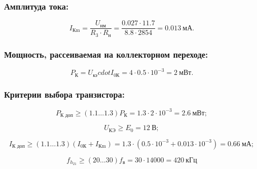   \subsubsection{Амплитуда тока:} %
  
  \begin{equation}
  \label{eq:equation6_9}
    I_{\text{Кm}} = \dfrac{U_{\text{нм}}}{R_3 \cdot R_{\text{н}}} = \dfrac{0.027 \cdot 11.7}{8.8 \cdot 2854} = 0.013~\text{мА}.
  \end{equation}
  
  \subsubsection{Мощность, рассеиваемая на коллекторном переходе:} %

  \begin{equation}
  \label{eq:equation6_10}
    P_{\text{К}} = U_{\text{кэ}} cdot I_{\text{0К}} = 4 \cdot 0.5 \cdot 10^{-3} = 2~\text{мВт}. 
  \end{equation}
  

  \subsubsection{Критерии выбора транзистора:} %

  \begin{equation}
  \label{eq:equation6_11}
    P_{\text{К доп}} \geq (1.1 \ldots 1.3) P_{\text{К}} = 1.3 \cdot 2 \cdot 10^{-3} = 2.6~\text{мВт};
  \end{equation} 

  \begin{equation}
   \label{eq:equation6_12}
     U_{\text{КЭ}} \geq E_0 = 12~\text{В};
  \end{equation} 

  \begin{equation}
  \label{eq:equation6_13}
    I_{\text{К доп}} \geq (1.1 \ldots 1.3)(I_{\text{0К}} + I_{\text{Кm}}) = 1.3 \cdot (0.5 \cdot 10^{-3} + 0.013 \cdot 10^{-3}) = 0.66~\text{мА}; 
  \end{equation} 

  \begin{equation}
   \label{eq:equation6_14}
     f_{h_{21}} \geq (20 \ldots 30) f_{\text{в}} = 30 \cdot 14000 = 420~\text{кГц}
  \end{equation} 

